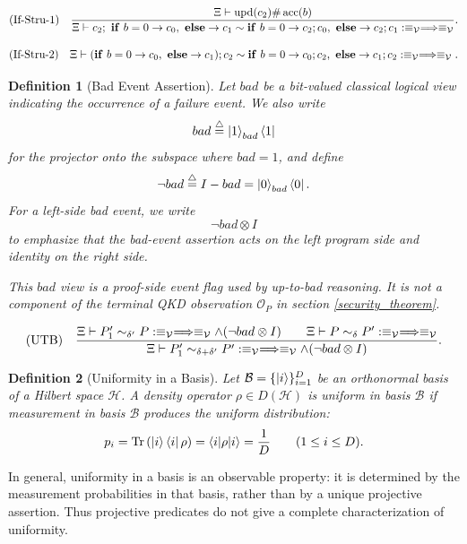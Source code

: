\documentclass[acmsmall,screen,review,anonymous,nonacm]{acmart}
\newtheorem{definition}{Definition}[section]
\theoremstyle{defn_style}
\begin{document}
\[
\text{\rm (If-Stru-1)}
\quad
\frac{
\Xi\vdash
\operatorname{upd}(c_2)
\#
\operatorname{acc}(b)
}{
\Xi
\vdash
c_2;\
\mathbf{if}\ b=0\rightarrow c_0,\ \mathbf{else}\rightarrow c_1
\sim
\mathbf{if}\ b=0\rightarrow c_2;c_0,\ \mathbf{else}\rightarrow c_2;c_1
:
\equiv_{\mathcal V}
\Longrightarrow
\equiv_{\mathcal V}
}.
\]

\[
\text{\rm (If-Stru-2)}
\quad
\Xi
\vdash
(\mathbf{if}\ b=0\rightarrow c_0,\ \mathbf{else}\rightarrow c_1);c_2
\sim
\mathbf{if}\ b=0\rightarrow c_0;c_2,\ \mathbf{else}\rightarrow c_1;c_2
:
\equiv_{\mathcal V}
\Longrightarrow
\equiv_{\mathcal V}.
\]

\begin{definition}[Bad Event Assertion]
Let \(bad\) be a bit-valued classical logical view indicating the occurrence of a failure event. We also write
\[
bad
\stackrel{\triangle}{=}
\ket 1_{bad}\bra 1
\]
for the projector onto the subspace where \(bad=1\), and define
\[
\neg bad
\stackrel{\triangle}{=}
I-bad
=
\ket 0_{bad}\bra 0.
\]
For a left-side bad event, we write
\[
\neg bad\otimes I
\]
to emphasize that the bad-event assertion acts on the left program side and
identity on the right side.

This \(bad\) view is a proof-side event flag used by up-to-bad reasoning.  It
is not a component of the terminal QKD observation \(\mathcal O_P\) in section \ref{security_theorem}. 
\end{definition}

\[
\text{\rm (UTB)}
\quad
\frac{
\Xi
\vdash
P'_1\sim_{\delta'}P:
\equiv_{\mathcal V}
\Longrightarrow
\equiv_{\mathcal V}\land(\neg bad\otimes I)
\qquad
\Xi
\vdash
P\sim_{\delta}P':
\equiv_{\mathcal V}
\Longrightarrow
\equiv_{\mathcal V}
}{
\Xi
\vdash
P'_1\sim_{\delta+\delta'}P':
\equiv_{\mathcal V}
\Longrightarrow
\equiv_{\mathcal V}\land(\neg bad\otimes I)
}.
\]



\begin{definition}[Uniformity in a Basis]
Let
\(\mathcal B=\{\ket{i}\}_{i=1}^{D}\)
be an orthonormal basis of a Hilbert space \(\mathcal H\). A density operator
\(\rho\in D(\mathcal H)\) is uniform in basis \(\mathcal B\) if measurement in
basis \(\mathcal B\) produces the uniform distribution:
\[
p_i=\operatorname{Tr}\left(\ket{i}\bra{i}\rho\right)
=\langle i|\rho|i\rangle
=\frac{1}{D}\qquad
(1\le i\le D).
\]
\end{definition}


In general, uniformity in a basis is an observable property: it is determined
by the measurement probabilities in that basis, rather than by a unique
projective assertion. Thus projective predicates do not give a complete
characterization of uniformity.
\end{document}
